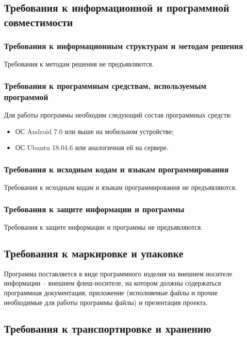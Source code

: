 \documentclass[a4paper,12pt,reqno]{article}
\begin{document}
  \subsection{Требования к информационной и программной совместимости}
  \subsubsection{Требования к информационным структурам и методам решения}
  Требования к методам решения не предъявляются.
  \subsubsection{Требования к программным средствам, используемым программой}
  Для работы программы необходим следующий состав программных средств:
  \begin{itemize}
    \item ОС Android 7.0 или выше на мобильном устройстве;
    \item ОС Ubuntu 18.04.6 или аналогичная ей на сервере.
  \end{itemize}
  \subsubsection{Требования к исходным кодам и языкам программирования}
  Требования к исходным кодам и языкам программирования не предъявляются.
  \subsubsection{Требования к защите информации и программы}
  Требования к защите информации и программы не предъявляются.

  \subsection{Требования к маркировке и упаковке}
  Программа поставляется в виде программного изделия на внешнем носителе информации -- внешнем флеш-носителе, на котором должны содержаться программная документация, приложение (исполняемые файлы и прочие необходимые для работы программы файлы) и презентация проекта.

  \subsection{Требования к транспортировке и хранению}
\end{document}
